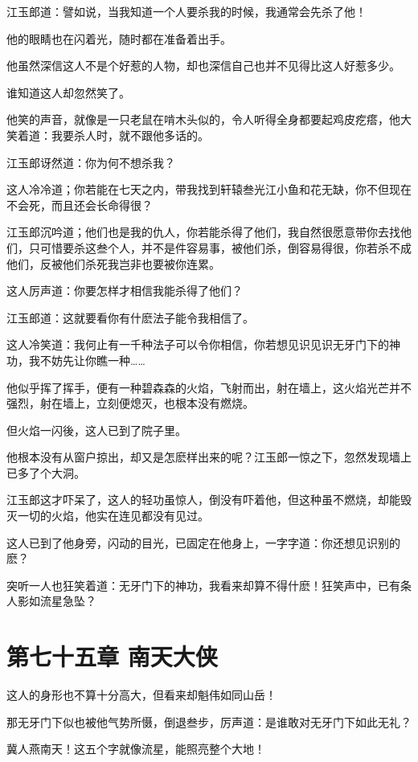 \documentclass[12pt,oneside]{book}
\begin{document}
江玉郎道：譬如说，当我知道一个人要杀我的时候，我通常会先杀了他！

他的眼睛也在闪着光，随时都在准备着出手。

他虽然深信这人不是个好惹的人物，却也深信自己也并不见得比这人好惹多少。

谁知道这人却忽然笑了。

他笑的声音，就像是一只老鼠在啃木头似的，令人听得全身都要起鸡皮疙瘩，他大笑着道：我要杀人时，就不跟他多话的。

江玉郎讶然道：你为何不想杀我？

这人冷冷道；你若能在七天之内，带我找到轩辕叁光江小鱼和花无缺，你不但现在不会死，而且还会长命得很？

江玉郎沉吟道；他们也是我的仇人，你若能杀得了他们，我自然很愿意带你去找他们，只可惜要杀这叁个人，并不是件容易事，被他们杀，倒容易得很，你若杀不成他们，反被他们杀死我岂非也要被你连累。

这人厉声道：你要怎样才相信我能杀得了他们？

江玉郎道：这就要看你有什麽法子能令我相信了。

这人冷笑道：我何止有一千种法子可以令你相信，你若想见识见识无牙门下的神功，我不妨先让你瞧一种\ldots\ldots{}

他似乎挥了挥手，便有一种碧森森的火焰，飞射而出，射在墙上，这火焰光芒并不强烈，射在墙上，立刻便熄灭，也根本没有燃烧。

但火焰一闪後，这人已到了院子里。

他根本没有从窗户掠出，却又是怎麽样出来的呢？江玉郎一惊之下，忽然发现墙上已多了个大洞。

江玉郎这才吓呆了，这人的轻功虽惊人，倒没有吓着他，但这种虽不燃烧，却能毁灭一切的火焰，他实在连见都没有见过。

这人已到了他身旁，闪动的目光，已固定在他身上，一字字道：你还想见识别的麽？

突听一人也狂笑着道：无牙门下的神功，我看来却算不得什麽！狂笑声中，已有条人影如流星急坠？

\hypertarget{ux7b2cux4e03ux5341ux4e94ux7ae0-ux5357ux5929ux5927ux4fa0}{%
\chapter{第七十五章
南天大侠}\label{ux7b2cux4e03ux5341ux4e94ux7ae0-ux5357ux5929ux5927ux4fa0}}

这人的身形也不算十分高大，但看来却魁伟如同山岳！

那无牙门下似也被他气势所慑，倒退叁步，厉声道：是谁敢对无牙门下如此无礼？

冀人燕南天！这五个字就像流星，能照亮整个大地！
\end{document}
